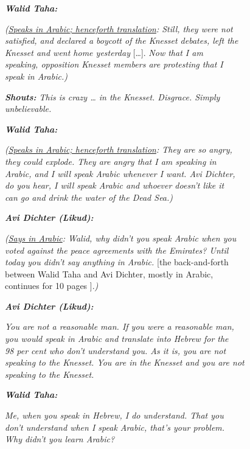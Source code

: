 \documentclass[output=paper,arabicfont]{langscibook}
\begin{document}
\begin{exe}
\begin{linenumbers*}
\textbf{\textit{Walid Taha:}}

\textit{(\ul{Speaks in Arabic; henceforth translation}: Still, they were not \\
satisfied, and declared a boycott of the Knesset debates, left the \\
Knesset and went home yesterday} […]. \textit{Now that I am \\
speaking, opposition Knesset members are protesting that I \\
speak in Arabic.)}

\textit{\textbf{Shouts:} This is crazy … in the Knesset. Disgrace. Simply\\ unbelievable.}

\textbf{\textit{Walid Taha:}}

\textit{(\ul{Speaks in Arabic; henceforth translation}: They are so angry, \\
they could explode. They are angry that I am speaking in \\
Arabic, and I will speak Arabic whenever I want. Avi Dichter,\\
do you hear, I will speak Arabic and whoever doesn’t like it\\
can go and drink the water of the Dead Sea.)}

\textit{\textbf{Avi Dichter (Likud):}}

\textit{(\ul{Says in Arabic}: Walid, why didn’t you speak Arabic when you\\
voted against the peace agreements with the Emirates? Until\\
today you didn’t say anything in Arabic.} [the back-and-forth\\
between Walid Taha and Avi Dichter, mostly in Arabic,\\
continues for 10 pages \citep[92–101]{knesset2022-a}].\textit{)}

\textit{\textbf{Avi Dichter (Likud):}}

\textit{You are not a reasonable man. If you were a reasonable man,\\
you would speak in Arabic and translate into Hebrew for the\\
98 per cent who don’t understand you. As it is, you are not\\
speaking to the Knesset. You are in the Knesset and you are not\\
speaking to the Knesset.} 

\textbf{\textit{Walid Taha:}}

\textit{Me, when you speak in Hebrew, I do understand. That you\\
don’t understand when I speak Arabic, that’s your problem.\\
Why didn’t you learn Arabic?}


\end{linenumbers*}
\end{exe}
\end{document}
